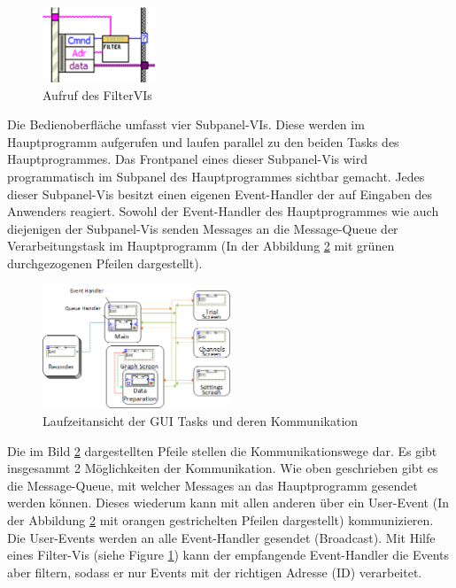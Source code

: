 \documentclass[10pt]{scrartcl}
\begin{document}
\begin{figure}
	\begin{center}
		\includegraphics[width=0.3\textwidth]{filterVI}
		\caption{Aufruf des FilterVIs}
		\label{fig:filterVI}
	\end{center}
\end{figure}
Die Bedienoberfläche umfasst vier Subpanel-VIs. Diese werden im Hauptprogramm aufgerufen und laufen parallel zu den beiden Tasks des Hauptprogrammes. Das \gls{Frontpanel} eines dieser Subpanel-Vis wird programmatisch im Subpanel des Hauptprogrammes sichtbar gemacht.  
Jedes dieser Subpanel-Vis besitzt einen eigenen Event-Handler der auf Eingaben des Anwenders reagiert. Sowohl der Event-Handler des Hauptprogrammes wie auch diejenigen der Subpanel-Vis senden Messages an die Message-Queue der Verarbeitungstask im Hauptprogramm (In der Abbildung \ref{fig:LaufzeitansichtUDA} mit grünen durchgezogenen Pfeilen dargestellt).





\begin{figure}
	\begin{center}
		\includegraphics[width=0.5\textwidth]{LaufzeitansichtMitRecorder}
		\caption{Laufzeitansicht der GUI Tasks und deren Kommunikation}
		\label{fig:LaufzeitansichtUDA}
	\end{center}
\end{figure}
Die im Bild \ref{fig:LaufzeitansichtUDA} dargestellten Pfeile stellen die Kommunikationswege dar. Es gibt insgesammt 2 Möglichkeiten der Kommunikation. Wie oben geschrieben gibt es die Message-Queue, mit welcher Messages an das Hauptprogramm gesendet werden können. Dieses wiederum kann mit allen anderen über ein User-Event (In der Abbildung \ref{fig:LaufzeitansichtUDA} mit orangen gestrichelten Pfeilen dargestellt) kommunizieren. Die User-Events werden an alle Event-Handler gesendet (Broadcast). Mit Hilfe eines Filter-Vis (siehe Figure \ref{fig:filterVI}) kann der empfangende Event-Handler die Events aber filtern, sodass er nur Events mit der richtigen Adresse (ID) verarbeitet.   
\end{document}
